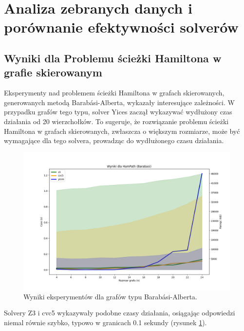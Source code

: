 


\section{Analiza zebranych danych i porównanie efektywności solverów}

\subsection{Wyniki dla Problemu ścieżki Hamiltona w grafie skierowanym}

Eksperymenty nad problemem ścieżki Hamiltona w grafach skierowanych, generowanych metodą Barabási-Alberta, wykazały interesujące zależności. W przypadku grafów tego typu, solver Yices zaczął wykazywać wydłużony czas działania od 20 wierzchołków. To sugeruje, że rozwiązanie problemu ścieżki Hamiltona w grafach skierowanych, zwłaszcza o większym rozmiarze, może być wymagające dla tego solvera, prowadząc do wydłużonego czasu działania.

\begin{figure}[htbp]
	\centering
	\begin{minipage}{\textwidth}
		\includegraphics[width=\textwidth]{./figures/1-barabasi-plot.png}
		\caption{Wyniki eksperymentów dla grafów typu Barabási-Alberta.}
		\label{fig:1-barabasi-plot}
	\end{minipage}
\end{figure}

Solvery Z3 i cvc5 wykazywały podobne czasy działania, osiągając odpowiedzi niemal równie szybko, typowo w granicach 0.1 sekundy (rysunek \ref{fig:1-barabasi-plot}). 

